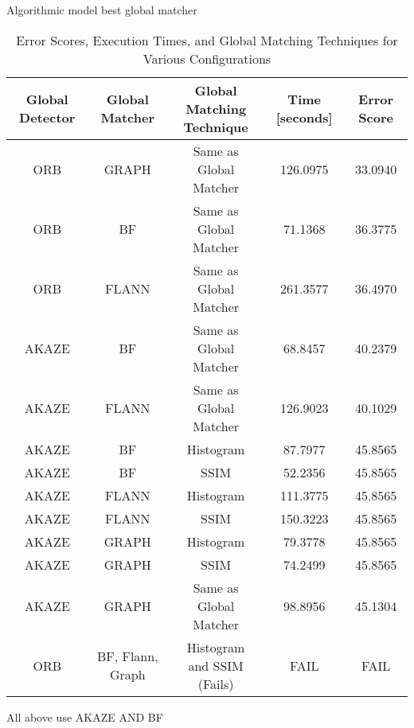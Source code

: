 Algorithmic model best global matcher

\begin{table}[H]
    \centering
    \small  %
    \setlength{\tabcolsep}{4pt}  %
    \renewcommand{\arraystretch}{1.2}  %
    \begin{tabular}{|c|c|c|c|c|}
    \hline
    \textbf{Global Detector} & \textbf{Global Matcher} & \makecell{\textbf{Global Matching} \\ \textbf{Technique}} & \textbf{Time [seconds]} & \textbf{Error Score} \\ \hline
    ORB & GRAPH & Same as Global Matcher & 126.0975 & 33.0940 \\ \hline
    ORB & BF & \makecell{Same as \\ Global Matcher} & 71.1368 & 36.3775 \\ \hline
    ORB & FLANN & \makecell{Same as \\ Global Matcher} & 261.3577 & 36.4970 \\ \hline
    AKAZE & BF & \makecell{Same as \\ Global Matcher} & 68.8457 & 40.2379 \\ \hline
    AKAZE & FLANN & \makecell{Same as \\ Global Matcher} & 126.9023 & 40.1029 \\ \hline
    AKAZE & BF & Histogram & 87.7977 & 45.8565 \\ \hline
    AKAZE & BF & SSIM & 52.2356 & 45.8565 \\ \hline
    AKAZE & FLANN & Histogram & 111.3775 & 45.8565 \\ \hline
    AKAZE & FLANN & SSIM & 150.3223 & 45.8565 \\ \hline
    AKAZE & GRAPH & Histogram & 79.3778 & 45.8565 \\ \hline
    AKAZE & GRAPH & SSIM & 74.2499 & 45.8565 \\ \hline
    AKAZE & GRAPH & \makecell{Same as \\ Global Matcher} & 98.8956 & 45.1304 \\ \hline
    ORB & BF, Flann, Graph & \makecell{Histogram \\ and SSIM (Fails)} & FAIL & FAIL \\ \hline
    \end{tabular}
    \caption{Error Scores, Execution Times, and Global Matching Techniques for Various Configurations}
\end{table}

All above use AKAZE AND BF


